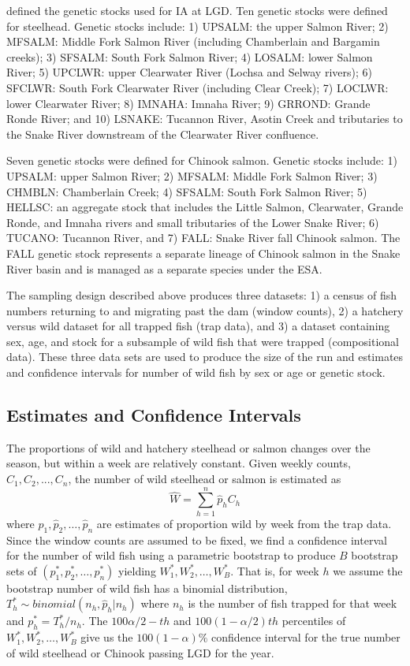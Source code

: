 \documentclass[%
                leqno,         %
%
]{nrc1}                          %
\begin{document}
\citet{Ackerman2014} defined the genetic stocks used for IA at LGD. Ten genetic stocks were defined for steelhead. Genetic stocks include: 1) UPSALM: the upper Salmon River; 2) MFSALM: Middle Fork Salmon River (including Chamberlain and Bargamin creeks); 3) SFSALM: South Fork Salmon River; 4) LOSALM: lower Salmon River; 5) UPCLWR: upper Clearwater River (Lochsa and Selway rivers); 6) SFCLWR: South Fork Clearwater River (including Clear Creek); 7) LOCLWR: lower Clearwater River; 8) IMNAHA: Imnaha River; 9) GRROND: Grande Ronde River; and 10) LSNAKE: Tucannon River, Asotin Creek and tributaries to the Snake River downstream of the Clearwater River confluence.

Seven genetic stocks were defined for Chinook salmon. Genetic stocks include: 1) UPSALM: upper Salmon River; 2) MFSALM: Middle Fork Salmon River; 3) CHMBLN: Chamberlain Creek; 4) SFSALM: South Fork Salmon River; 5) HELLSC: an aggregate stock that includes the Little Salmon, Clearwater, Grande Ronde, and Imnaha rivers and small tributaries of the Lower Snake River; 6) TUCANO: Tucannon River, and 7) FALL: Snake River fall Chinook salmon. The FALL genetic stock represents a separate lineage of Chinook salmon in the Snake River basin and is managed as a separate species under the ESA.

The sampling design described above produces three datasets: 1) a census of fish numbers returning to and migrating past the dam (window counts), 2) a hatchery versus wild dataset for all trapped fish (trap data), and 3) a dataset containing sex, age, and stock for a subsample of wild fish that were trapped (compositional data). These three data sets are used to produce the size of the run and estimates and confidence intervals for number of wild fish by sex or age or genetic stock.

\subsection*{Estimates and Confidence Intervals}
The proportions of wild and hatchery steelhead or salmon changes over the season, but within a week are relatively constant. Given weekly counts, \(C_1,C_2,...,C_n\),   the number of wild steelhead or salmon is estimated as
\[\hat{W}=\sum\limits_{h=1}^{n} \hat{p}_hC_h\]	  
where \(\hat{p}_1, \hat{p}_2, \ldots, \hat{p}_n \) are estimates of proportion wild by week from the trap data.  Since the window counts are assumed to be fixed, we find a confidence interval for the number of wild fish using a parametric  bootstrap to produce $B$ bootstrap sets of \((p^*_1, p^*_2, \ldots, p^*_n)\) yielding \(W^*_1, W^*_2, \ldots, W^*_B\).   That is, for week $h$ we assume the bootstrap number of wild fish has a binomial distribution,  \(T^*_h\sim binomial(n_h,\hat{p}_h|n_h)\) where \(n_h\)  is the number of fish trapped for that  week and \(p^*_h = T^*_h/n_h\).  The \(100\alpha/2-th\) and \(100(1- \alpha/2)th\) percentiles of \(W^*_1, W^*_2, \ldots, W^*_B\) give us the \(100(1-\alpha)\%\) confidence interval for the true number of wild steelhead or Chinook passing LGD for the year.
\end{document}
